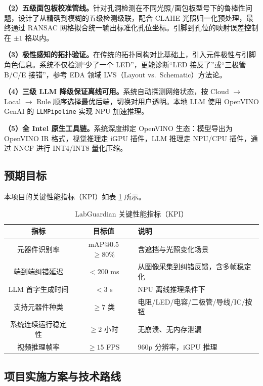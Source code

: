 \documentclass[a4paper,12pt,fontset=ubuntu]{ctexart}
\begin{document}
\textbf{（2）五级面包板校准管线。}针对孔洞检测在不同光照/面包板型号下的鲁棒性问题，设计了从精确到模糊的五级检测级联，配合 CLAHE 光照归一化预处理，最终通过 RANSAC 网格拟合统一输出标准化孔位坐标。引脚到孔位的映射误差控制在 $\pm 1$ 格以内。

\textbf{（3）极性感知的拓扑验证。}在传统的拓扑同构对比基础上，引入元件极性与引脚角色信息。系统不仅检测“少了一个 LED”，更能诊断“LED 接反了”或“三极管 B/C/E 接错”，参考 EDA 领域 LVS（Layout vs.\ Schematic）方法论。

\textbf{（4）三级 LLM 降级保证离线可用。}系统自动探测网络状态，按 Cloud $\rightarrow$ Local $\rightarrow$ Rule 顺序选择最优后端，切换对用户透明。本地 LLM 使用 OpenVINO GenAI 的 \texttt{LLMPipeline} 实现 NPU 加速推理。

\textbf{（5）全 Intel 原生工具链。}系统深度绑定 OpenVINO 生态：模型导出为 OpenVINO IR 格式，视觉推理走 iGPU 插件，LLM 推理走 NPU/CPU 插件，通过 NNCF 进行 INT4/INT8 量化压缩。

\subsection{预期目标}

本项目的关键性能指标（KPI）如表 \ref{tab:kpi} 所示。

\begin{table}[htbp]
    \centering
    \caption{LabGuardian 关键性能指标（KPI）}
    \label{tab:kpi}
    \begin{tabular}{c c l}
        \toprule
        \textbf{指标} & \textbf{目标值} & \textbf{说明} \\
        \midrule
        元器件识别率 & mAP@0.5 $\ge 80\%$ & 含遮挡与光照变化场景 \\
        端到端纠错延迟 & $< 200$ ms & 从图像采集到纠错反馈，含多帧稳定化 \\
        LLM 首字生成时间 & $< 3$ s & NPU 离线推理条件下 \\
        支持元器件种类 & $\ge 7$ 类 & 电阻/LED/电容/二极管/导线/IC/按钮 \\
        系统连续运行稳定性 & $\ge 2$ 小时 & 无崩溃、无内存泄漏 \\
        视频推理帧率 & $\ge 15$ FPS & 960p 分辨率，iGPU 推理 \\
        \bottomrule
    \end{tabular}
\end{table}


\subsection{项目实施方案与技术路线}
\end{document}
